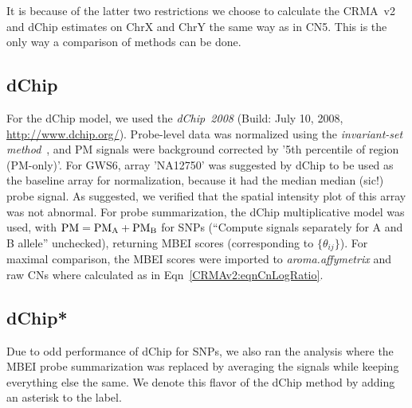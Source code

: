\documentclass[10pt,a4paper]{article}
\newcommand{\PMA}{\ensuremath{\textnormal{PM}_\textnormal{A}}\xspace}
\newcommand{\PMB}{\ensuremath{\textnormal{PM}_\textnormal{B}}\xspace}
\newcommand{\pkg}[1]{\textit{#1}\xspace}
\newcommand{\PM}{\textnormal{PM}\xspace}
\begin{document}
It is because of the latter two restrictions we choose to calculate the CRMA~v2 and dChip estimates on ChrX and ChrY the same way as in CN5.  This is the only way a comparison of methods can be done.




\subsection{dChip}
For the dChip model, we used the \pkg{dChip~2008} (Build: July 10, 2008, \url{http://www.dchip.org/}).  Probe-level data was normalized using the \emph{invariant-set method}~\citep{LiWong_2001}, and PM signals were background corrected by '5th percentile of region (PM-only)'.  For GWS6, array 'NA12750' was suggested by dChip to be used as the baseline array for normalization, because it had the median median (sic!) probe signal.  As suggested, we verified that the spatial intensity plot of this array was not abnormal.
For probe summarization, the dChip multiplicative model was used, with $\PM=\PMA+\PMB$ for SNPs (``Compute signals separately for A and B allele'' unchecked), returning MBEI scores (corresponding to $\{\theta_{ij}\}$).  For maximal comparison, the MBEI scores were imported to \pkg{aroma.affymetrix} and raw CNs where calculated as in Eqn~\eqref{CRMAv2:eqnCnLogRatio}.


\subsection{dChip*}
Due to odd performance of dChip for SNPs, we also ran the analysis where the MBEI probe summarization was replaced by averaging the signals while keeping everything else the same.  We denote this flavor of the dChip method by adding an asterisk to the label.
\end{document}

